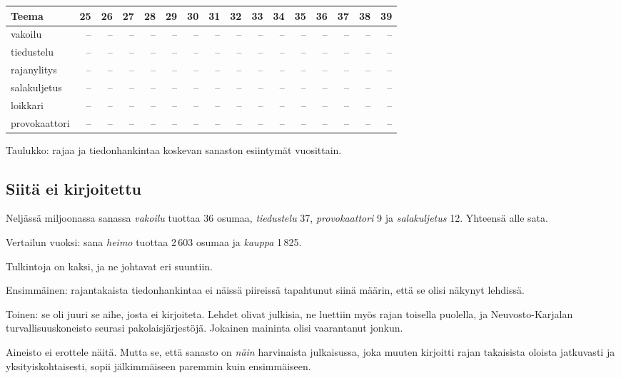 \documentclass[10pt,a4paper]{article}
\begin{document}
\begin{center}\small
\begin{tabular}{@{}lrrrrrrrrrrrrrrr@{}}
\toprule
\textbf{Teema} & \textbf{25} & \textbf{26} & \textbf{27} & \textbf{28} & \textbf{29} & \textbf{30} & \textbf{31} & \textbf{32} & \textbf{33} & \textbf{34} & \textbf{35} & \textbf{36} & \textbf{37} & \textbf{38} & \textbf{39}\\
\midrule
vakoilu & -- & -- & -- & -- & -- & -- & -- & -- & -- & -- & -- & -- & -- & -- & --\\
tiedustelu & -- & -- & -- & -- & -- & -- & -- & -- & -- & -- & -- & -- & -- & -- & --\\
rajanylitys & -- & -- & -- & -- & -- & -- & -- & -- & -- & -- & -- & -- & -- & -- & --\\
salakuljetus & -- & -- & -- & -- & -- & -- & -- & -- & -- & -- & -- & -- & -- & -- & --\\
loikkari & -- & -- & -- & -- & -- & -- & -- & -- & -- & -- & -- & -- & -- & -- & --\\
provokaattori & -- & -- & -- & -- & -- & -- & -- & -- & -- & -- & -- & -- & -- & -- & --\\
\bottomrule
\end{tabular}
\end{center}
{\footnotesize Taulukko: rajaa ja tiedonhankintaa koskevan sanaston esiintymät vuosittain.}

\subsection{Siitä ei kirjoitettu}

Neljässä miljoonassa sanassa \emph{vakoilu} tuottaa 36 osumaa, \emph{tiedustelu} 37,
\emph{provokaattori} 9 ja \emph{salakuljetus} 12. Yhteensä alle sata.

Vertailun vuoksi: sana \emph{heimo} tuottaa 2\,603 osumaa ja \emph{kauppa} 1\,825.

Tulkintoja on kaksi, ja ne johtavat eri suuntiin.

Ensimmäinen: rajantakaista tiedonhankintaa ei näissä piireissä tapahtunut siinä
määrin, että se olisi näkynyt lehdissä.

Toinen: se oli juuri se aihe, josta ei kirjoiteta. Lehdet olivat julkisia, ne luettiin
myös rajan toisella puolella, ja Neuvosto-Karjalan turvallisuuskoneisto seurasi
pakolaisjärjestöjä. Jokainen maininta olisi vaarantanut jonkun.

Aineisto ei erottele näitä. Mutta se, että sanasto on \emph{näin} harvinaista
julkaisussa, joka muuten kirjoitti rajan takaisista oloista jatkuvasti ja
yksityiskohtaisesti, sopii jälkimmäiseen paremmin kuin ensimmäiseen.
\end{document}
